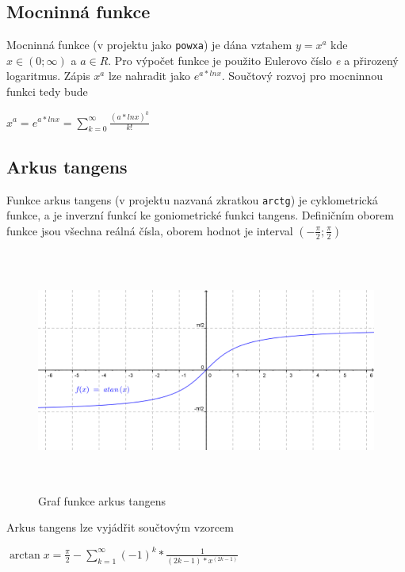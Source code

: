 \documentclass[12pt,a4paper,titlepage,final]{article}
\begin{document}
\subsection{Mocninná funkce}

Mocninná funkce (v projektu jako \texttt{powxa}) je dána vztahem $y=x^a$ kde
$x\in(0;\infty)$ a $a\in R$.
Pro výpočet funkce je použito Eulerovo číslo \textit{e} a přirozený 
logaritmus. Zápis $x^a$ lze nahradit jako $e^{a*ln x}$. Součtový rozvoj pro
mocninnou funkci tedy bude
\begin{center}
$ {\displaystyle x^a = e^{a*ln x} = \sum_{k=0}^{\infty} 
\frac{ (a*ln x)^k }{ k! }}$\end{center}

\subsection{Arkus tangens}

Funkce arkus tangens (v projektu nazvaná zkratkou \texttt{arctg}) je
cyklometrická funkce, a je inverzní funkcí ke goniometrické funkci tangens.
Definičním oborem funkce jsou všechna reálná čísla, oborem hodnot je interval
$(-\frac{\pi}{2};\frac{\pi}{2})$

\begin{figure}[htbp]
  \centering
  \includegraphics[height=8cm]{img/atangens.png}
  \caption{Graf funkce arkus tangens}
  \label{fig:atangens}
\end{figure}

Arkus tangens lze vyjádřit součtovým vzorcem 

\begin{center}
$ {\displaystyle \arctan x = \frac {\pi}{2} - \sum_{k=1}^{\infty} 
(-1)^k * \frac{1}{(2k-1)*x^{(2k-1)}}}$\end{center}
\end{document}
